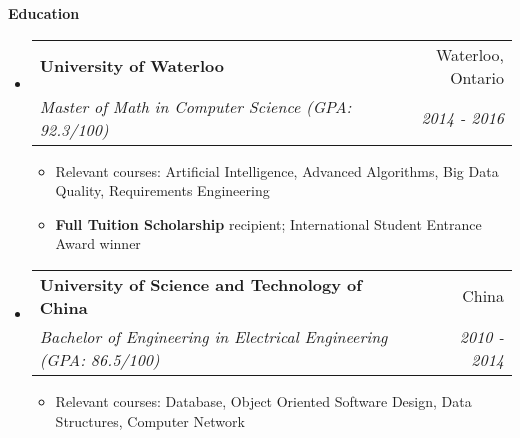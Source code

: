\documentclass[letterpaper,10pt]{article}
\makeatletter
\newcommand{\resitem}[1]{\item #1 \vspace{-2pt}}
\newcommand{\resheading}[1]{{\large \colorbox{mygrey}{\begin{minipage}{\textwidth}{\textbf{#1 \vphantom{p\^{E}}}}\end{minipage}}}}
\newcommand{\ressubheading}[4]{
\begin{tabular*}{7.0in}{l@{\extracolsep{\fill}}r}
		\textbf{#1} & #2 \\
		\textit{#3} & \textit{#4} \\
\end{tabular*}\vspace{-6pt}}
\makeatother
\begin{document}
\resheading{Education}
\begin{itemize}
\itemsep0em
\item
	\ressubheading{University of Waterloo}{Waterloo, Ontario}{Master of Math in Computer Science (GPA: 92.3/100)}{2014 - 2016}
	\begin{itemize}
		\resitem{Relevant courses: Artificial Intelligence, Advanced Algorithms, Big Data Quality, Requirements Engineering}
        \resitem{\textbf{Full Tuition Scholarship} recipient; International Student Entrance Award winner}
	\end{itemize}
\item
	\ressubheading{University of Science and Technology of China}{China}{Bachelor of Engineering in Electrical Engineering (GPA: 86.5/100)}{2010 - 2014}
	\begin{itemize}
		\resitem{Relevant courses: Database, Object Oriented Software Design, Data Structures, Computer Network}
	\end{itemize}

\end{itemize}
\end{document}
